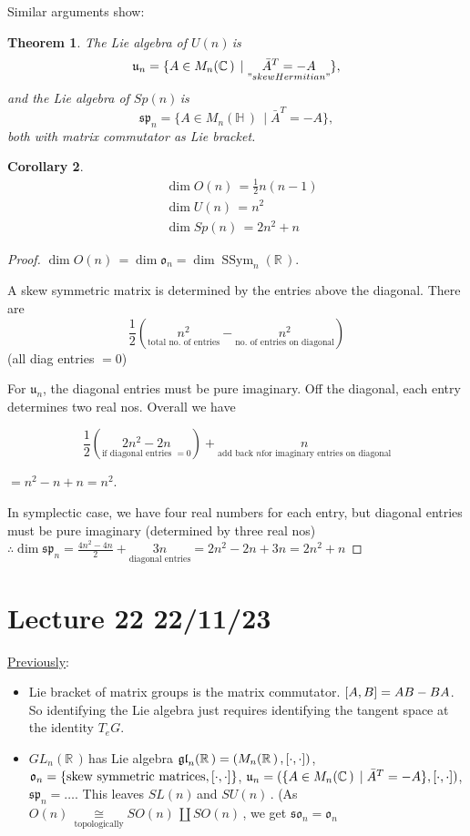 \documentclass[12pt,a4paper]{article}
\newcommand{\rR}{\ensuremath{\mathbb{R}\,}}
\newcommand{\cC}{\ensuremath{\mathbb{C}\,}}
\newcommand{\hH}{\ensuremath{\mathbb{H}\,}}
\newcommand{\teg}{\ensuremath{T_e G}} %
\newcommand{\mnr}{\ensuremath{M_n(\rR)\,}}
\newcommand{\mnc}{\ensuremath{M_n(\cC)\,}}
\newcommand{\mnh}{\ensuremath{M_n(\hH)\,}}
\newcommand{\glnr}{\ensuremath{GL_n(\rR)\,}}
\newcommand{\gon}{\ensuremath{O(n)\,}}
\newcommand{\gun}{\ensuremath{U(n)\,}}
\newcommand{\gspn}{\ensuremath{Sp(n)\,}}
\newcommand{\gson}{\ensuremath{SO(n)\,}}
\newcommand{\gsun}{\ensuremath{SU(n)\,}}
\newcommand{\gsln}{\ensuremath{SL(n)\,}}
\newcommand{\lglnr}{\ensuremath{\mathfrak{gl}_n(\rR)}}
\newcommand{\lgon}{\ensuremath{\mathfrak{o}_n}}
\newcommand{\lgson}{\ensuremath{\mathfrak{so}_n}}
\newcommand{\lgun}{\ensuremath{\mathfrak{u}_n}}
\newcommand{\lgspn}{\ensuremath{\mathfrak{sp}_n}}
\newcommand{\ul}[1]{\underline{#1}}
\newcommand{\ecomm}{\ensuremath{\comm{\cdot}{\cdot}}}
\newtheorem{thm}{Theorem}[subsubsection]
\newtheorem{cor}[thm]{Corollary}
\begin{document}
Similar arguments show:

\begin{thm}
The Lie algebra of \gun is 
\[\lgun = \{A\in \mnc \mid \underset{"skew Hermitian"}{\bar{A}^T=-A}\},\] 
and the Lie algebra of \gspn is 
\[\lgspn = \{A\in \mnh \mid \bar{A}^T=-A\},\]
both with matrix commutator as Lie bracket.
\end{thm}

\begin{cor}
\begin{align*}
& \dim \gon = \frac{1}{2}n(n-1)\\
& \dim \gun = n^2\\
& \dim \gspn = 2n^2+n
\end{align*}
\end{cor}

\begin{proof}
$\dim \gon = \dim \lgon = \dim \operatorname{SSym}_n(\rR)$.

A skew symmetric matrix is determined by the entries above the diagonal. There are 
\[\frac{1}{2}\left(\underset{\text{total no. of entries}}{n^2}- \underset{\text{no. of entries on diagonal}}{n^2}\right)\]
(all diag entries $=0$)

For \lgun, the diagonal entries must be pure imaginary. Off the diagonal, each entry determines two real nos. Overall we have 

\[\frac{1}{2}\left(\underset{\text{if diagonal entries } = 0}{2n^2-2n}\right) + \underset{\text{add back } n \text{for imaginary entries on diagonal}}{n}\]

$=n^2-n+n=n^2$.

In symplectic case, we have four real numbers for each entry, but diagonal entries must be pure imaginary (determined by three real nos) 
$\therefore \dim\lgspn= \frac{4n^2-4n}{2}+\underset{\text{diagonal entries}}{3n}=2n^2-2n+3n=2n^2+n $
\end{proof}

\section{Lecture 22 22/11/23}
\ul{Previously}:

\begin{itemize}
\item Lie bracket of matrix groups is the matrix commutator. $\comm{A}{B}=AB-BA$. So identifying the Lie algebra just requires identifying the tangent space at the identity \teg.
\item \glnr has Lie algebra $\lglnr=(\mnr, \ecomm)$, $\lgon=\{\text{skew symmetric matrices}, \ecomm\}$, $\lgun=(\{A\in\mnc \mid \bar{A}^T=-A \},\ecomm)$, $\lgspn=\ldots$. This leaves \gsln and \gsun. (As $\gon\underset{\text{topologically}}{\cong} \gson \amalg \gson$, we get $\lgson=\lgon$
\end{itemize}
\end{document}
